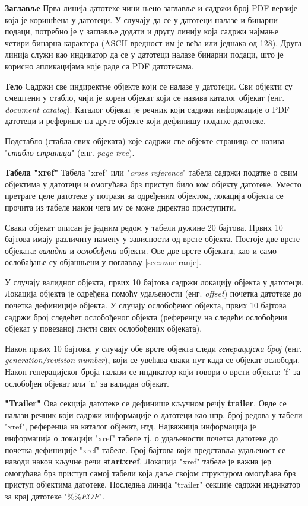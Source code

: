 \documentclass[12pt,oneside]{memoir}
\begin{document}
\begin{description}
\item \textbf{Заглавље} Прва линија датотеке чини њено заглавље и садржи број PDF верзије која је коришћена у датотеци. У случају да се у датотеци налазе и бинарни подаци, потребно је у заглавље додати и другу линију која садржи најмање четири бинарна карактера (ASCII вредност им је већа или једнака од 128). Друга линија служи као индикатор да се у датотеци налазе бинарни подаци, што је корисно апликацијама које раде са PDF датотекама.
\item \textbf{Тело} Садржи све индиректне објекте који се налазе у датотеци.
Сви објекти су смештени у стабло, чији је корен објекат који се назива каталог објекат (енг. \textit{document catalog}). Каталог објекат је речник који садржи информације о PDF датотеци и реферише на друге објекте који дефинишу податке датотеке. 

Подстабло (стабла свих објеката) које садржи све објекте страница се назива "\textit{стабло страница}" (енг. \textit{page tree}). 
\item \textbf{Табела "xref"} Табела "xref" или "\textit{cross reference}" табела садржи податке о свим објектима у датотеци и омогућава брз приступ било ком објекту датотеке. Уместо претраге целе датотеке у потрази за одређеним објектом, локација објекта се прочита из табеле након чега му се може директно приступити.

Сваки објекат описан је једним редом у табели дужине 20 бајтова. Првих 10 бајтова имају различиту намену у зависности од врсте објекта. Постоје две врсте објеката: \textit{валидни} и \textit{ослобођени} објекти. Ове две врсте објеката, као и само ослобађање су објашњени у поглављу \ref{sec:azuriranje}. 

У случају валидног објекта, првих 10 бајтова садржи локацију објекта у датотеци. Локација објекта је одређена помоћу удаљености (енг. \textit{offset}) почетка датотеке до почетка дефиниције објекта. У случају ослобођеног објекта, првих 10 бајтова садржи број следећег ослобођеног објекта (референцу на следећи ослобођени објекат у повезаној листи свих ослобођених објеката).

Након првих 10 бајтова, у случају обе врсте објекта следи \textit{генерацијски број} (енг. \textit{generation/revision number}), који се увећава сваки пут када се објекат ослободи. Након генерацијског броја налази се индикатор који говори о врсти објекта: 'f' за ослобођен објекат или 'n' за валидан објекат. 
\item \textbf{"Trailer"} Ова секција датотеке се дефинише кључном речју \textbf{trailer}. Овде се налази речник који садржи информације о датотеци као нпр. број редова у табели "xref", референца на каталог објекат, итд. Најважнија информација је информација о локацији "xref" табеле тј. о удаљености почетка датотеке до почетка дефиниције "xref" табеле. Број бајтова који представља удаљеност се наводи након кључне речи \textbf{startxref}. Локација "xref" табеле је важна јер омогућава брз приступ самој табели која даље својом структуром омогућава брз приступ објектима датотеке. Последња линија "trailer" секције садржи индикатор за крај датотеке "$\%\%EOF$".
\end{description}
\end{document}
